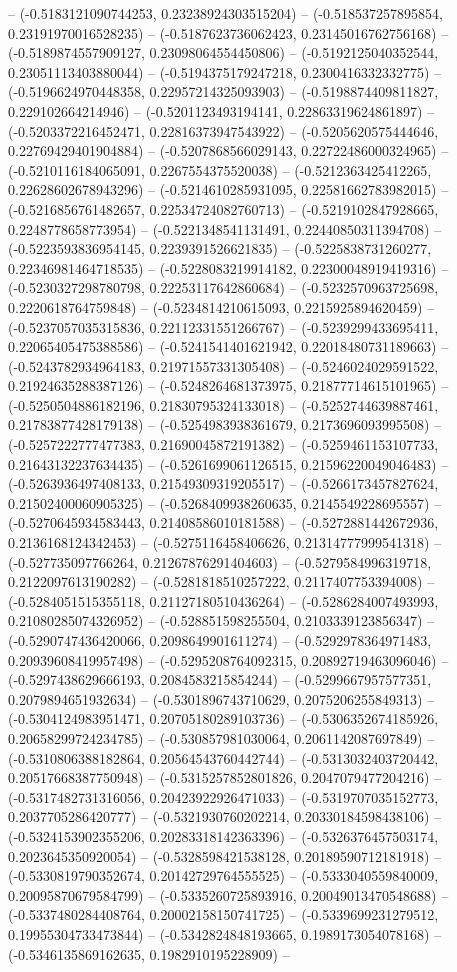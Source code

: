 -- (-0.5183121090744253, 0.23238924303515204) -- (-0.518537257895854, 0.23191970016528235) -- (-0.5187623736062423, 0.23145016762756168) -- (-0.5189874557909127, 0.23098064554450806) -- (-0.5192125040352544, 0.23051113403880044) -- (-0.5194375179247218, 0.2300416332332775) -- (-0.5196624970448358, 0.22957214325093903) -- (-0.5198874409811827, 0.229102664214946) -- (-0.5201123493194141, 0.22863319624861897) -- (-0.5203372216452471, 0.22816373947543922) -- (-0.5205620575444646, 0.22769429401904884) -- (-0.5207868566029143, 0.22722486000324965) -- (-0.5210116184065091, 0.2267554375520038) -- (-0.5212363425412265, 0.22628602678943296) -- (-0.5214610285931095, 0.22581662783982015) -- (-0.5216856761482657, 0.22534724082760713) -- (-0.5219102847928665, 0.2248778658773954) -- (-0.5221348541131491, 0.22440850311394708) -- (-0.5223593836954145, 0.2239391526621835) -- (-0.5225838731260277, 0.22346981464718535) -- (-0.5228083219914182, 0.22300048919419316) -- (-0.5230327298780798, 0.22253117642860684) -- (-0.5232570963725698, 0.2220618764759848) -- (-0.5234814210615093, 0.2215925894620459) -- (-0.5237057035315836, 0.22112331551266767) -- (-0.5239299433695411, 0.22065405475388586) -- (-0.5241541401621942, 0.22018480731189663) -- (-0.5243782934964183, 0.21971557331305408) -- (-0.5246024029591522, 0.21924635288387126) -- (-0.5248264681373975, 0.21877714615101965) -- (-0.5250504886182196, 0.21830795324133018) -- (-0.5252744639887461, 0.21783877428179138) -- (-0.5254983938361679, 0.2173696093995508) -- (-0.5257222777477383, 0.21690045872191382) -- (-0.5259461153107733, 0.21643132237634435) -- (-0.5261699061126515, 0.21596220049046483) -- (-0.5263936497408133, 0.21549309319205517) -- (-0.5266173457827624, 0.21502400060905325) -- (-0.5268409938260635, 0.2145549228695557) -- (-0.5270645934583443, 0.21408586010181588) -- (-0.5272881442672936, 0.2136168124342453) -- (-0.5275116458406626, 0.21314777999541318) -- (-0.527735097766264, 0.21267876291404603) -- (-0.5279584996319718, 0.2122097613190282) -- (-0.5281818510257222, 0.2117407753394008) -- (-0.5284051515355118, 0.21127180510436264) -- (-0.5286284007493993, 0.21080285074326952) -- (-0.528851598255504, 0.2103339123856347) -- (-0.5290747436420066, 0.2098649901611274) -- (-0.5292978364971483, 0.20939608419957498) -- (-0.5295208764092315, 0.20892719463096046) -- (-0.5297438629666193, 0.2084583215854244) -- (-0.5299667957577351, 0.2079894651932634) -- (-0.5301896743710629, 0.2075206255849313) -- (-0.5304124983951471, 0.20705180289103736) -- (-0.5306352674185926, 0.20658299724234785) -- (-0.530857981030064, 0.2061142087697849) -- (-0.5310806388182864, 0.20564543760442744) -- (-0.5313032403720442, 0.20517668387750948) -- (-0.5315257852801826, 0.2047079477204216) -- (-0.5317482731316056, 0.20423922926471033) -- (-0.5319707035152773, 0.2037705286420777) -- (-0.5321930760202214, 0.20330184598438106) -- (-0.5324153902355206, 0.20283318142363396) -- (-0.5326376457503174, 0.2023645350920054) -- (-0.5328598421538128, 0.20189590712181918) -- (-0.5330819790352674, 0.20142729764555525) -- (-0.5333040559840009, 0.20095870679584799) -- (-0.5335260725893916, 0.20049013470548688) -- (-0.5337480284408764, 0.20002158150741725) -- (-0.5339699231279512, 0.19955304733473844) -- (-0.5342824848193665, 0.1989173054078168) -- (-0.5346135869162635, 0.1982910195228909) -- 